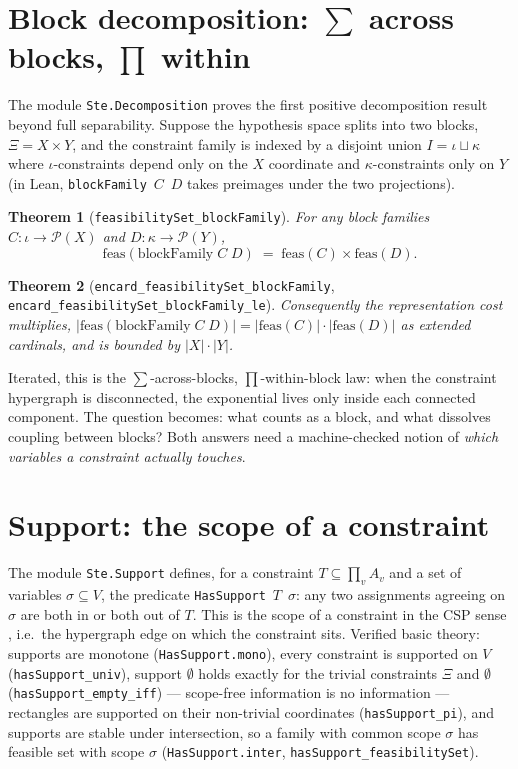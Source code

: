 \documentclass[11pt]{article}
\newtheorem{theorem}{Theorem}
\newcommand{\lean}[1]{\texttt{#1}}
\newcommand{\feas}{\mathrm{feas}}
\newcommand{\Xii}{\Xi}
\begin{document}
\section{Block decomposition: $\sum$ across blocks, $\prod$ within}

The module \lean{Ste.Decomposition} proves the first positive
decomposition result beyond full separability.  Suppose the hypothesis
space splits into two blocks, $\Xii = X \times Y$, and the constraint
family is indexed by a disjoint union $I = \iota \sqcup \kappa$ where
$\iota$-constraints depend only on the $X$ coordinate and
$\kappa$-constraints only on $Y$ (in Lean, \lean{blockFamily}~$C$~$D$
takes preimages under the two projections).

\begin{theorem}[\lean{feasibilitySet\_blockFamily}]
For any block families $C : \iota \to \mathcal{P}(X)$ and
$D : \kappa \to \mathcal{P}(Y)$,
\[
  \feas(\mathrm{blockFamily}\;C\;D)
  \;=\; \feas(C) \times \feas(D).
\]
\end{theorem}

\begin{theorem}[\lean{encard\_feasibilitySet\_blockFamily},
\lean{encard\_feasibilitySet\_blockFamily\_le}]
Consequently the representation cost multiplies,
$|\feas(\mathrm{blockFamily}\;C\;D)| = |\feas(C)| \cdot |\feas(D)|$
as extended cardinals, and is bounded by $|X| \cdot |Y|$.
\end{theorem}

Iterated, this is the $\sum$-across-blocks, $\prod$-within-block law:
when the constraint hypergraph is disconnected, the exponential lives
only inside each connected component.  The question becomes: what
counts as a block, and what dissolves coupling between blocks?  Both
answers need a machine-checked notion of \emph{which variables a
constraint actually touches}.

\section{Support: the scope of a constraint}

The module \lean{Ste.Support} defines, for a constraint
$T \subseteq \prod_v A_v$ and a set of variables
$\sigma \subseteq V$, the predicate \lean{HasSupport}~$T$~$\sigma$:
any two assignments agreeing on $\sigma$ are both in or both out of
$T$.  This is the scope of a constraint in the CSP sense
\citep{dechter2003constraint}, i.e.\ the hypergraph edge on which the
constraint sits.  Verified basic theory: supports are monotone
(\lean{HasSupport.mono}), every constraint is supported on $V$
(\lean{hasSupport\_univ}), support $\emptyset$ holds exactly for the
trivial constraints $\Xii$ and $\emptyset$
(\lean{hasSupport\_empty\_iff}) --- scope-free information is no
information --- rectangles are supported on their non-trivial
coordinates (\lean{hasSupport\_pi}), and supports are stable under
intersection, so a family with common scope $\sigma$ has feasible set
with scope $\sigma$ (\lean{HasSupport.inter},
\lean{hasSupport\_feasibilitySet}).
\end{document}
